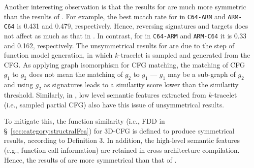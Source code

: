 
Another interesting observation is that the results for \toolNew are much more symmetric than the results of \tool. For example, the best match rate for \toolNew in \texttt{C64-ARM} and \texttt{ARM-C64} is 0.431 and 0.479, respectively. Hence, reversing signatures and targets does not affect as much as that in \tool. In contrast,  for \tool in \texttt{C64-ARM} and \texttt{ARM-C64} it is 0.33 and 0.162, respectively. The unsymmetrical results for \tool are due to the step of function model generation, in which $k$-tracelet is sampled and generated from the CFG. As applying graph isomorphism for CFG matching, the matching of CFG $g_1$ to $g_2$ does not mean the matching of $g_2$ to $g_1$ --- $g_1$ may be a sub-graph of $g_2$ and using $g_2$ as signatures leads to a similarity score lower than the similarity threshold. Similarly, in \tool, low level semantic features extracted from $k$-tracelet (i.e., sampled partial CFG) also have this issue of unsymmetrical results.

To mitigate this, the function similarity  (i.e., FDD in \S~\ref{sec:category:structralFea}) for 3D-CFG is defined to produce symmetrical results, according to Definition 3. In addition, the high-level semantic features (e.g., function call information) are retained in cross-architecture compilation. Hence, the results of \toolNew are more symmetrical than that of \tool.

